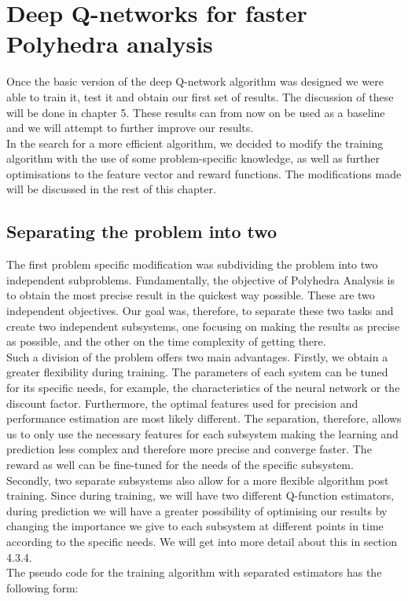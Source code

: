 \section{Deep Q-networks for faster Polyhedra analysis}
Once the basic version of the deep Q-network algorithm was designed we were able to train it, test it and obtain our first set of results. The discussion of these will be done in chapter 5. These results can from now on be used as a baseline and we will attempt to further improve our results.\\
In the search for a more efficient algorithm, we decided to modify the training algorithm with the use of some problem-specific knowledge, as well as further optimisations to the feature vector and reward functions. The modifications made will be discussed in the rest of this chapter.


\subsection{Separating the problem into two}
The first problem specific modification was subdividing the problem into two independent subproblems. Fundamentally, the objective of Polyhedra Analysis is to obtain the most precise result in the quickest way possible. These are two independent objectives. Our goal was, therefore, to separate these two tasks and create two independent subsystems, one focusing on making the results as precise as possible, and the other on the time complexity of getting there.\\
 Such a division of the problem offers two main advantages. Firstly, we obtain a greater flexibility during training. The parameters of each system can be tuned for its specific needs, for example, the characteristics of the neural network or the discount factor. Furthermore, the optimal features used for precision and performance estimation are most likely different. The separation, therefore, allows us to only use the necessary features for each subsystem making the learning and prediction less complex and therefore more precise and converge faster. The reward as well can be fine-tuned for the needs of the specific subsystem.\\ 
 Secondly, two separate subsystems also allow for a more flexible algorithm post training. Since during training, we will have two different Q-function estimators, during prediction we will have a greater possibility of optimising our results by changing the importance we give to each subsystem at different points in time according to the specific needs. We will get into more detail about this in section 4.3.4.\\
 The pseudo code for the training algorithm with separated estimators has the following form:


